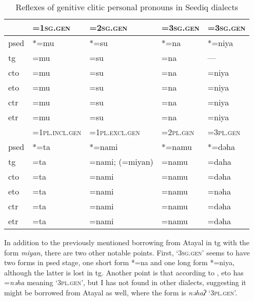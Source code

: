 \begin{table}[!htbp]
\centering
\caption{Reflexes of genitive clitic personal pronouns in Seediq dialects}
\label{tab:genclitic}
\begin{tabular}{lllll}
\hline
      & =\textsc{1sg.gen}      & =\textsc{2sg.gen}        & =\textsc{3sg.gen} & =\textsc{3sg.gen}       \\ \hline
\acs{psed} & *=mu          & *=su            & *=na     & *=niya         \\
\acs{tg}  & =mu           & =su             & =na      & ---            \\
\acs{cto}  & =mu           & =su             & =na      & =niya          \\
\acs{eto}  & =mu           & =su             & =na      & =niya          \\
\acs{ctr} & =mu           & =su             & =na      & =niya          \\
\acs{etr} & =mu           & =su             & =na      & =niya          \\ \hline
      & =\textsc{1pl.incl.gen} & =\textsc{1pl.excl.gen}   & =\textsc{2pl.gen} & =\textsc{3pl.gen}       \\ \hline
\acs{psed} & *=ta          & *=nami          & *=namu   & *=dəha         \\
\acs{tg}  & =ta           & =nami; (=miyan) & =namu    & =daha          \\
\acs{cto}  & =ta           & =nami           & =namu    & =dəha          \\
\acs{eto}  & =ta           & =nami           & =namu    & =nəha          \\
\acs{ctr} & =ta           & =nami           & =namu    & =dəha          \\
\acs{etr} & =ta           & =nami           & =namu    & =dəha     \\ \hline
\end{tabular}
\end{table}

In addition to the previously mentioned borrowing from Atayal in \acl{tg} with the form \textit{miyan}, there are two other notable points. First, `\textsc{3sg.gen}' seems to have two forms in \acl{psed} stage, one short form *=na and one long form *=niya, although the latter is lost in \acl{tg}. Another point is that according to \textcite{lee2015tawsa}, \acl{eto} has =\textit{nəha} meaning `\textsc{3pl.gen}', but I has not found in other dialects, suggesting it might be borrowed from Atayal as well, where the form is \textit{nəhaʔ} `\textsc{3pl.gen}'.

